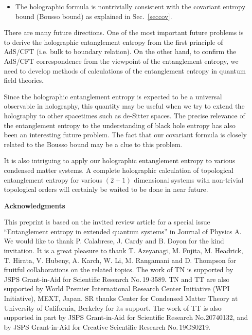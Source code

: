 \documentclass[12pt]{article}
\begin{document}
\begin{itemize}
 \item The holographic formula is nontrivially consistent with the
  covariant entropy bound (Bousso bound) as explained in Sec.\ \ref{seccov}.

\end{itemize}

There are many future directions.
One of the most important future problems is to
derive the holographic entanglement entropy from the first principle of AdS/CFT
(i.e. bulk to boundary relation).  On the other hand,
to confirm the AdS/CFT correspondence from the
viewpoint of the entanglement entropy, we need to develop methods of calculations of
the entanglement entropy in quantum field theories.

Since the holographic entanglement entropy is expected to be
a universal observable
in holography, this quantity may be useful when we try to extend the holography
to other spacetimes such as de-Sitter spaces. The precise relevance of the entanglement entropy
to the understanding of black hole entropy has also been an interesting future problem. The fact that our
covariant formula is closely related to the Bousso bound may be a clue to this problem.

It is also intriguing to apply our holographic entanglement entropy to various condensed matter
systems. A complete holographic calculation of topological entanglement entropy for various $(2+1)$
dimensional systems with non-trivial topological orders will certainly be waited to be done in near future.






\vskip6mm
\noindent
{\bf Acknowledgments}

\vskip2mm

This preprint is based on the invited review article for a special issue ``Entanglement
entropy in extended quantum systems'' in Journal of Physics A. We would like to thank
P. Calabrese, J. Cardy and B. Doyon for the kind invitation.
It is a great pleasure to thank T. Azeyanagi, M. Fujita, M. Headrick, T. Hirata,
V. Hubeny, A. Karch, W. Li, M. Rangamani and D. Thompson for fruitful
collaborations on the related topics.
The work of TN is supported by JSPS Grant-in-Aid for Scientific Research No.\,19$\cdot$3589.
TN and TT are also supported by World Premier International Research Center Initiative
(WPI Initiative), MEXT, Japan.
SR thanks Center for Condensed Matter Theory at University of
California, Berkeley for its support.
The work of TT is also supported in
part by JSPS Grant-in-Aid for Scientific Research No.20740132, and
by JSPS Grant-in-Aid for Creative Scientific Research No.\,19GS0219.
\end{document}
